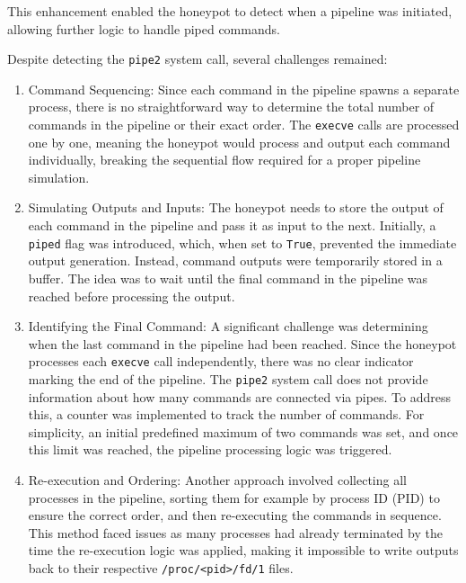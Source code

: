 This enhancement enabled the honeypot to detect when a pipeline was initiated, allowing further logic to handle piped commands.

Despite detecting the \texttt{pipe2} system call, several challenges remained:

\begin{enumerate}
    \item Command Sequencing: Since each command in the pipeline spawns a separate process, there is no straightforward way to determine the total number of commands in the pipeline or their exact order. The \texttt{execve} calls are processed one by one, meaning the honeypot would process and output each command individually, breaking the sequential flow required for a proper pipeline simulation.

    \item Simulating Outputs and Inputs: The honeypot needs to store the output of each command in the pipeline and pass it as input to the next. Initially, a \texttt{piped} flag was introduced, which, when set to \texttt{True}, prevented the immediate output generation. Instead, command outputs were temporarily stored in a buffer. The idea was to wait until the final command in the pipeline was reached before processing the output.

    \item Identifying the Final Command: A significant challenge was determining when the last command in the pipeline had been reached. Since the honeypot processes each \texttt{execve} call independently, there was no clear indicator marking the end of the pipeline. The \texttt{pipe2} system call does not provide information about how many commands are connected via pipes. To address this, a counter was implemented to track the number of commands. For simplicity, an initial predefined maximum of two commands was set, and once this limit was reached, the pipeline processing logic was triggered.

    \item Re-execution and Ordering: Another approach involved collecting all processes in the pipeline, sorting them for example by process ID (PID) to ensure the correct order, and then re-executing the commands in sequence. This method faced issues as many processes had already terminated by the time the re-execution logic was applied, making it impossible to write outputs back to their respective \texttt{/proc/<pid>/fd/1} files.
\end{enumerate}

